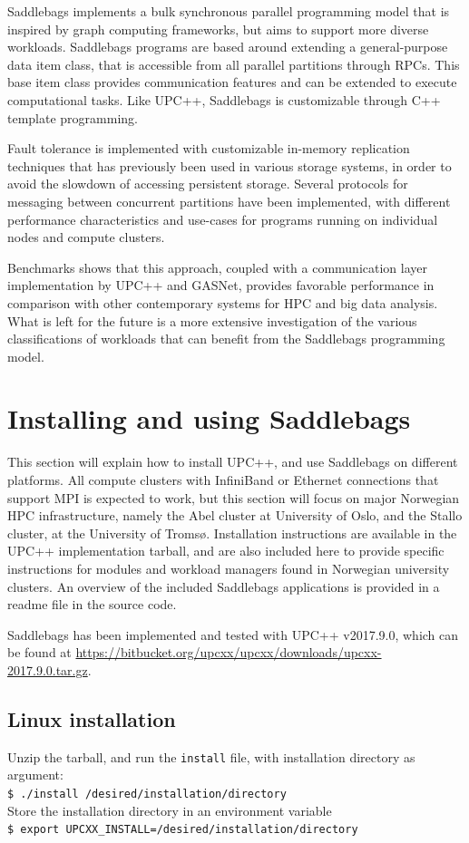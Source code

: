 \documentclass{uit-report}
\begin{document}
Saddlebags implements a bulk synchronous parallel programming model that is inspired by graph computing frameworks, but aims to support more diverse workloads. Saddlebags programs are based around extending a general-purpose data item class, that is accessible from all parallel partitions through RPCs. This base item class provides communication features and can be extended to execute computational tasks. Like UPC++, Saddlebags is customizable through C++ template programming.

Fault tolerance is implemented with customizable in-memory replication techniques that has previously been used in various storage systems, in order to avoid the slowdown of accessing persistent storage. Several protocols for messaging between concurrent partitions have been implemented, with different performance characteristics and use-cases for programs running on individual nodes and compute clusters.

Benchmarks shows that this approach, coupled with a communication layer implementation by UPC++ and GASNet, provides favorable performance in comparison with other contemporary systems for HPC and big data analysis. What is left for the future is a more extensive investigation of the various classifications of workloads that can benefit from the Saddlebags programming model.

\pagebreak


\newpage
\mbox{} \pagebreak
\appendix
\chapter{Installing and using Saddlebags}
This section will explain how to install UPC++, and use Saddlebags on different platforms. All compute clusters with InfiniBand or Ethernet connections that support MPI is expected to work, but this section will focus on major Norwegian HPC infrastructure, namely the Abel cluster at University of Oslo, and the Stallo cluster, at the University of Tromsø. Installation instructions are available in the UPC++ implementation tarball, and are also included here to provide specific instructions for modules and workload managers found in Norwegian university clusters. An overview of the included Saddlebags applications is provided in a readme file in the source code.

Saddlebags has been implemented and tested with UPC++ v2017.9.0, which can be found at {\url{https://bitbucket.org/upcxx/upcxx/downloads/upcxx-2017.9.0.tar.gz}}.
\section{Linux installation}\label{section:installinux}
Unzip the tarball, and run the \texttt{install} file, with installation directory as argument:\\
\phantom{11111} \texttt{\$ ./install /desired/installation/directory}\\
Store the installation directory in an environment variable\\
\phantom{11111} \texttt{\$ export UPCXX\_INSTALL=/desired/installation/directory}\\
\end{document}
